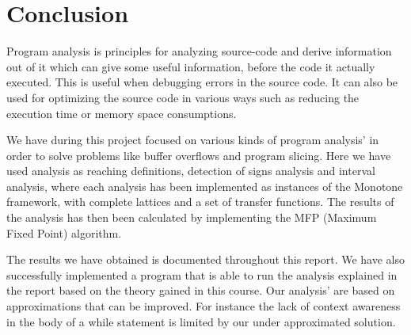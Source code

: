 \chapter{Conclusion}

Program analysis is principles for analyzing source-code and derive information out of it which can give some useful information, before the code it actually executed. This is useful when debugging errors in the source code. It can also be used for optimizing the source code in various ways such as reducing the execution time or memory space consumptions.


We have during this project focused on various kinds of program analysis' in order to solve problems like buffer overflows and program slicing. Here we have used analysis as reaching definitions, detection of signs analysis and interval analysis, where each analysis has been implemented as instances of the Monotone framework, with complete lattices and a set of transfer functions.
The results of the analysis has then been calculated by implementing the MFP (Maximum Fixed Point) algorithm.

The results we have obtained is documented throughout this report.
We have also successfully implemented a program that is able to run the analysis explained in the report based on the theory gained in this course. Our analysis' are based on approximations that can be improved. For instance the lack of context awareness in the body of a while statement is limited by our under approximated solution.